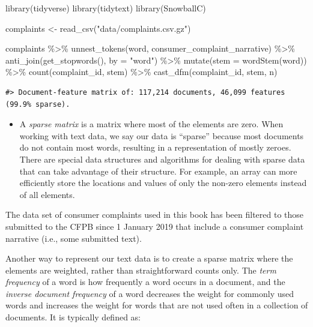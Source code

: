 \documentclass[
]{krantz}
\makeatletter
\newenvironment{Shaded}{\begin{snugshade}}{\end{snugshade}}
\newcommand{\AttributeTok}[1]{\textcolor[rgb]{0.77,0.63,0.00}{#1}}
\newcommand{\FunctionTok}[1]{\textcolor[rgb]{0.00,0.00,0.00}{#1}}
\newcommand{\NormalTok}[1]{#1}
\newcommand{\OtherTok}[1]{\textcolor[rgb]{0.56,0.35,0.01}{#1}}
\newcommand{\SpecialCharTok}[1]{\textcolor[rgb]{0.00,0.00,0.00}{#1}}
\newcommand{\StringTok}[1]{\textcolor[rgb]{0.31,0.60,0.02}{#1}}
\newenvironment{kframe}{%
\medskip{}
\setlength{\fboxsep}{.8em}
 \def\at@end@of@kframe{}%
 \ifinner\ifhmode%
  \def\at@end@of@kframe{\end{minipage}}%
  \begin{minipage}{\columnwidth}%
 \fi\fi%
 \def\FrameCommand##1{\hskip\@totalleftmargin \hskip-\fboxsep
 \colorbox{shadecolor}{##1}\hskip-\fboxsep
     \hskip-\linewidth \hskip-\@totalleftmargin \hskip\columnwidth}%
 \MakeFramed {\advance\hsize-\width
   \@totalleftmargin\z@ \linewidth\hsize
   \@setminipage}}%
 {\par\unskip\endMakeFramed%
 \at@end@of@kframe}
\renewenvironment{Shaded}{\begin{kframe}}{\end{kframe}}
\newenvironment{rmdblock}[1]
  {\begin{shaded*}
  \begin{itemize}[left = -1cm, labelsep = 1cm]
  \renewcommand{\labelitemi}{
    \raisebox{-.7\height}[0pt][0pt]{
      {\setkeys{Gin}{width=3em,keepaspectratio}\texttt{[image: images/\#1]}}
    }
  }
 
  \item
  }
  {
  \end{itemize}
  \end{shaded*}
  }
\newenvironment{rmdwarning}
  {\begin{rmdblock}{warning}}
  {\end{rmdblock}}
\makeatother
\begin{document}
\begin{Shaded}
\begin{Highlighting}[]
\FunctionTok{library}\NormalTok{(tidyverse)}
\FunctionTok{library}\NormalTok{(tidytext)}
\FunctionTok{library}\NormalTok{(SnowballC)}

\NormalTok{complaints }\OtherTok{\textless{}{-}} \FunctionTok{read\_csv}\NormalTok{(}\StringTok{"data/complaints.csv.gz"}\NormalTok{)}

\NormalTok{complaints }\SpecialCharTok{\%\textgreater{}\%}
  \FunctionTok{unnest\_tokens}\NormalTok{(word, consumer\_complaint\_narrative) }\SpecialCharTok{\%\textgreater{}\%}
  \FunctionTok{anti\_join}\NormalTok{(}\FunctionTok{get\_stopwords}\NormalTok{(), }\AttributeTok{by =} \StringTok{"word"}\NormalTok{) }\SpecialCharTok{\%\textgreater{}\%}
  \FunctionTok{mutate}\NormalTok{(}\AttributeTok{stem =} \FunctionTok{wordStem}\NormalTok{(word)) }\SpecialCharTok{\%\textgreater{}\%}
  \FunctionTok{count}\NormalTok{(complaint\_id, stem) }\SpecialCharTok{\%\textgreater{}\%}
  \FunctionTok{cast\_dfm}\NormalTok{(complaint\_id, stem, n)}
\end{Highlighting}
\end{Shaded}

\begin{verbatim}
#> Document-feature matrix of: 117,214 documents, 46,099 features (99.9% sparse).
\end{verbatim}


\begin{rmdwarning}
A \emph{sparse matrix} is a matrix where most of the elements are zero.
When working with text data, we say our data is ``sparse'' because most
documents do not contain most words, resulting in a representation of
mostly zeroes. There are special data structures and algorithms for
dealing with sparse data that can take advantage of their structure. For
example, an array can more efficiently store the locations and values of
only the non-zero elements instead of all elements.
\end{rmdwarning}

The data set of consumer complaints used in this book has been filtered to those submitted to the CFPB since 1 January 2019 that include a consumer complaint narrative (i.e., some submitted text).

Another way to represent our text data is to create a sparse matrix where the elements are weighted, rather than straightforward counts only. The \emph{term frequency} of a word is how frequently a word occurs in a document, and the \emph{inverse document frequency} of a word decreases the weight for commonly used words and increases the weight for words that are not used often in a collection of documents. It is typically defined as:
\end{document}
